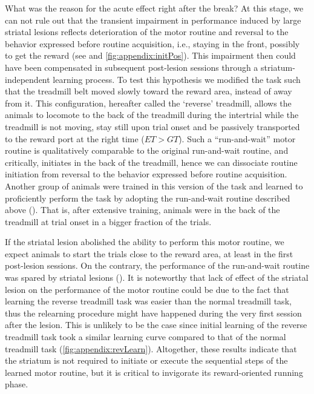 What was the reason for the acute effect right after the break?
At this stage, we can not rule out that the transient impairment in performance induced by large striatal lesions reflects deterioration of the motor routine and reversal to the behavior expressed before routine acquisition, i.e., staying in the front, possibly to get the reward (see  and \autoref{fig:appendix:initPos}).
This impairment then could have been compensated in subsequent post-lesion sessions through a striatum-independent learning process.
To test this hypothesis we modified the task such that the treadmill belt moved slowly toward the reward area, instead of away from it.
This configuration, hereafter called the `reverse' treadmill, allows the animals to locomote to the back of the treadmill during the intertrial while the treadmill is not moving, stay still upon trial onset and be passively transported to the reward port at the right time ($ET>GT$).
Such a ``run-and-wait'' motor routine is qualitatively comparable to the original run-and-wait routine, and critically, initiates in the back of the treadmill, hence we can dissociate routine initiation from reversal to the behavior expressed before routine acquisition.
Another group of animals were trained in this version of the task and learned to proficiently perform the task by adopting the run-and-wait routine described above ().
That is, after extensive training, animals were in the back of the treadmill at trial onset in a bigger fraction of the trials. 

If the striatal lesion abolished the ability to perform this motor routine, we expect animals to start the trials close to the reward area, at least in the first post-lesion sessions.
On the contrary, the performance of the run-and-wait routine was spared by striatal lesions ().
It is noteworthy that lack of effect of the striatal lesion on the performance of the motor routine could be due to the fact that learning the reverse treadmill task was easier than the normal treadmill task, thus the relearning procedure might have happened during the very first session after the lesion.
This is unlikely to be the case since initial learning of the reverse treadmill task took a similar learning curve compared to that of the normal treadmill task (\autoref{fig:appendix:revLearn}).
Altogether, these results indicate that the striatum is not required to initiate or execute the sequential steps of the learned motor routine, but it is critical to invigorate its reward-oriented running phase.


